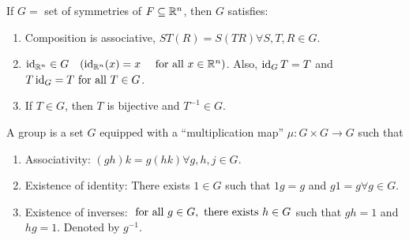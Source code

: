 \begin{properties}
    If \(G =\) set of symmetries of \(F \subseteq \mathbb{R}^n\), then \(G\) satisfies:
    \begin{enumerate}
        \item Composition is associative, \(ST(R) = S(TR) \forall S,T,R \in G\).
        \item \(\operatorname{id}_{\mathbb{R}^n} \in G \quad (\operatorname{id}_{\mathbb{R}^n}(x) = x \quad \text{ for all } x \in \mathbb{R}^n)\). Also, \(\operatorname{id}_G T = T\) and \(T\operatorname{id}_G = T \text{ for all } T \in G\).
        \item If \(T \in G\), then \(T\) is bijective and \(T^{-1} \in G\).
    \end{enumerate}
\end{properties}

\begin{definition}[Group]
    A group is a set \(G\) equipped with a ``multiplication map'' \(\mu: G \times G \to G\) such that
    \begin{enumerate}[label=\arabic*)]
        \item Associativity: \((gh)k = g(hk) \forall g,h,j \in G\).
        \item Existence of identity: There exists \(1 \in G\) such that \(1g = g\) and \(g1 = g \forall g \in G\).
        \item Existence of inverses: \(\oldforall g \in G, \exists h \in G\) such that \(gh = 1\) and \(hg = 1\). Denoted by \(g^{-1}\).
    \end{enumerate}
\end{definition}


